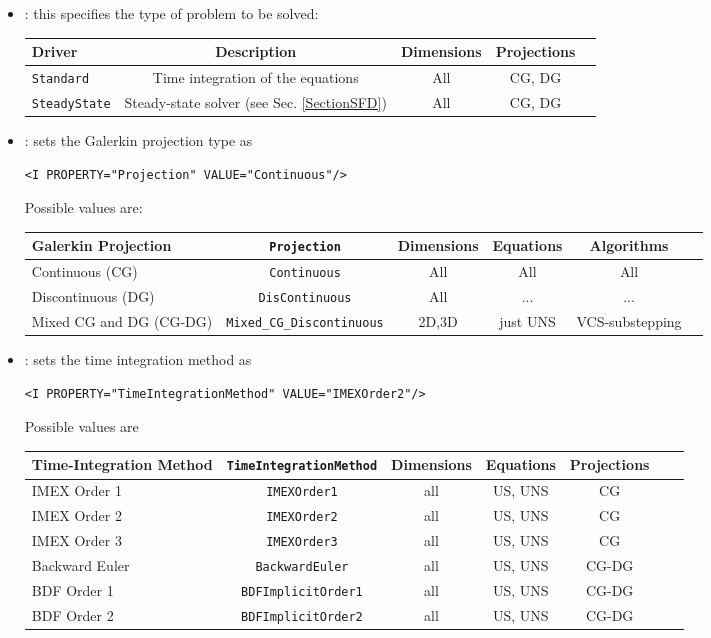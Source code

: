 \begin{itemize}
\item {}: this specifies the type of problem to be solved:
\begin{center}
\footnotesize
\begin{tabular}{lcccc}
\toprule
{Driver} & {Description} &{Dimensions}&{Projections} \\
\midrule
\texttt{Standard} & Time integration of the equations & All & CG, DG \\
\texttt{SteadyState} & Steady-state solver (see Sec. \ref{SectionSFD})  & All & CG, DG \\
\bottomrule
\end{tabular}
\end{center}

\item {}: sets the Galerkin projection type as
\begin{lstlisting}[style=XMLStyle]
<I PROPERTY="Projection" VALUE="Continuous"/>
\end{lstlisting}

Possible values are:
\begin{center}
\footnotesize
\begin{tabular}{lccccc}
\toprule
{Galerkin Projection} & \texttt{Projection} &{Dimensions}&{Equations}&{Algorithms} \\
\midrule
Continuous (CG)&  \texttt{Continuous} & All & All & All \\
Discontinuous (DG) & \texttt{DisContinuous} & All &...&...\\
Mixed CG and DG (CG-DG) & \texttt{Mixed\_CG\_Discontinuous} & 2D,3D & just UNS & VCS-substepping \\
\bottomrule
\end{tabular}
\end{center}


\item {}:  sets the time integration method as
\begin{lstlisting}[style=XMLStyle]
<I PROPERTY="TimeIntegrationMethod" VALUE="IMEXOrder2"/>
\end{lstlisting}

Possible values are
\begin{center}
\footnotesize
\begin{tabular}{lcccccc}
\toprule
{Time-Integration Method} & \texttt{TimeIntegrationMethod} &{Dimensions}&{Equations}&Projections\\
\midrule
IMEX Order 1 & \texttt{IMEXOrder1} & all & US, UNS &  CG \\
IMEX Order 2 & \texttt{IMEXOrder2} & all & US, UNS &  CG \\
IMEX Order 3 & \texttt{IMEXOrder3} & all & US, UNS & CG \\
Backward Euler & \texttt{BackwardEuler} & all & US, UNS &  CG-DG \\
BDF Order 1 & \texttt{BDFImplicitOrder1} & all & US, UNS & CG-DG \\
BDF Order 2 & \texttt{BDFImplicitOrder2} & all & US, UNS & CG-DG \\
\bottomrule
\end{tabular}
\end{center}


\end{itemize}
